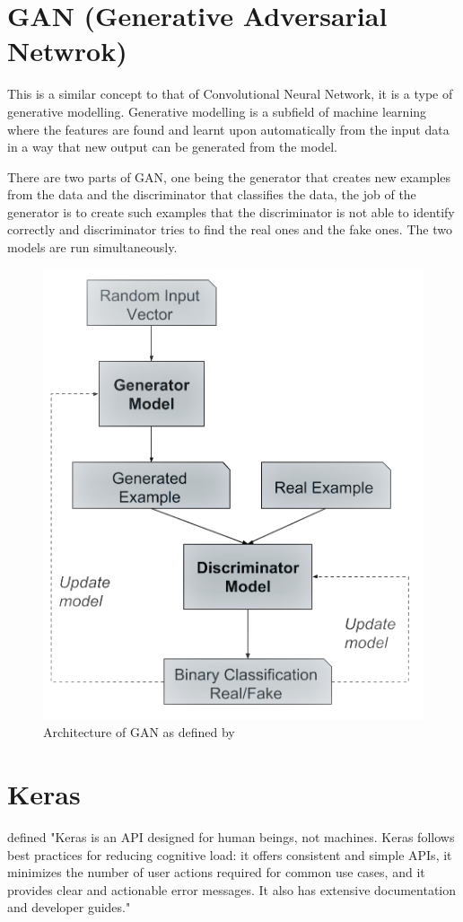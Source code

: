 \documentclass[oneside,12pt]{Classes/RoboticsLaTeX}
\begin{document}
\section{GAN (Generative Adversarial Netwrok)}

This is a similar concept to that of Convolutional Neural Network, it is a type of generative modelling. Generative modelling  is a subfield of machine learning where the features are found and learnt upon automatically from the input data in  a way that new output can be generated from the model.

There are two parts of GAN, one being the generator that creates new examples from the data and the discriminator that classifies the data, the job of the generator is to create such examples that the discriminator is not able to identify correctly and discriminator tries to find the real ones and the fake ones. The two models are run simultaneously.

\begin{figure}[H]
  \centering
  \includegraphics[width=0.5\linewidth]{Figures/gan.png}
  \caption{Architecture of GAN as defined by \cite{brownlee_2019}}
  \label{fig:gan}
\end{figure}

\section{Keras}

\cite{keras} defined "Keras is an API designed for human beings, not machines. Keras follows best practices for reducing cognitive load: it offers consistent and simple APIs, it minimizes the number of user actions required for common use cases, and it provides clear and actionable error messages. It also has extensive documentation and developer guides."
\end{document}
